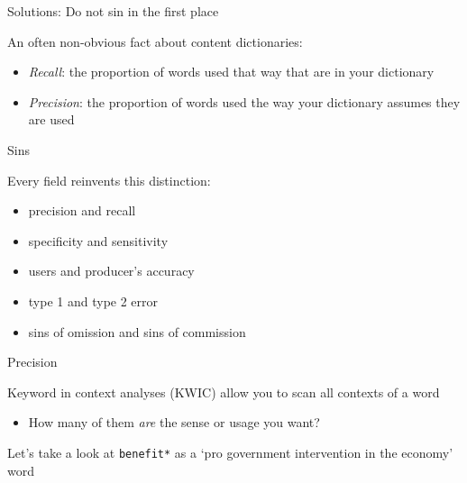 \documentclass{hertieteaching}
\begin{document}
\begin{frame}{Solutions: Do not sin in the first place}

\pause

An often non-obvious fact about content dictionaries:

\begin{itemize}
  \item \textit{Recall}: the proportion of words used that way that are in your dictionary
  \item \textit{Precision}: the proportion of words used the way your dictionary
  assumes they are used
\end{itemize}

\end{frame}

\begin{frame}{Sins}

Every field reinvents this distinction:

\begin{itemize}
\item
  precision and recall
  \item
  specificity and sensitivity
  \item
  users and producer's accuracy
  \item
  type 1 and type 2 error
  \item sins of omission and sins of commission
\end{itemize}

\end{frame}

\begin{frame}{Precision}

Keyword in context analyses (KWIC) allow you to scan all contexts of a word 

\begin{itemize}
\item
  How many of them \textit{are} the sense or usage you want?
\end{itemize}

Let's take a look at \texttt{benefit*} as a `pro government intervention in the economy' word

\end{frame}
\end{document}
